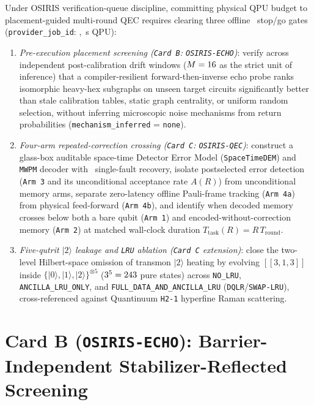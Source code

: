 \documentclass[aps,prx,twocolumn,superscriptaddress,nofootinbib]{revtex4-2}
\begin{document}
Under OSIRIS verification-queue discipline, committing physical QPU budget to placement-guided multi-round QEC requires clearing three offline \ecqExecTier\ stop/go gates (\texttt{provider\_job\_id}: \ecqJobId, \ecqQpuSec\,s QPU):
\begin{enumerate}
  \item \emph{Pre-execution placement screening (\texttt{Card B}: \texttt{OSIRIS-ECHO})}: verify across independent post-calibration drift windows ($M = 16$ as the strict unit of inference) that a compiler-resilient forward-then-inverse echo probe ranks isomorphic heavy-hex subgraphs on unseen target circuits significantly better than stale calibration tables, static graph centrality, or uniform random selection, without inferring microscopic noise mechanisms from return probabilities (\texttt{mechanism\_inferred} = \texttt{none}).
  \item \emph{Four-arm repeated-correction crossing (\texttt{Card C}: \texttt{OSIRIS-QEC})}: construct a glass-box auditable space-time Detector Error Model (\texttt{SpaceTimeDEM}) and \texttt{MWPM} decoder with \ecqSingleFaultRecoveryPct\ single-fault recovery, isolate postselected error detection (\texttt{Arm 3} and its unconditional acceptance rate $A(R)$) from unconditional memory arms, separate zero-latency offline Pauli-frame tracking (\texttt{Arm 4a}) from physical feed-forward (\texttt{Arm 4b}), and identify when decoded memory crosses below both a bare qubit (\texttt{Arm 1}) and encoded-without-correction memory (\texttt{Arm 2}) at matched wall-clock duration $T_{\mathrm{task}}(R) = R\,T_{\mathrm{round}}$.
  \item \emph{Five-qutrit $|2\rangle$ leakage and \texttt{LRU} ablation (\texttt{Card C} extension)}: close the two-level Hilbert-space omission of transmon $|2\rangle$ heating by evolving $[[3,1,3]]$ inside $\{|0\rangle,|1\rangle,|2\rangle\}^{\otimes 5}$ ($3^5 = 243$ pure states) across \texttt{NO\_LRU}, \texttt{ANCILLA\_LRU\_ONLY}, and \texttt{FULL\_DATA\_AND\_ANCILLA\_LRU} (\texttt{DQLR}/\texttt{SWAP-LRU}), cross-referenced against Quantinuum \texttt{H2-1} hyperfine Raman scattering.
\end{enumerate}

\section{Card B (\texttt{OSIRIS-ECHO}): Barrier-Independent Stabilizer-Reflected Screening}
\end{document}
